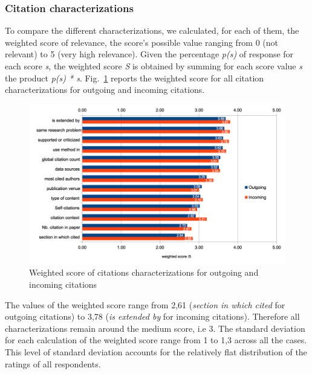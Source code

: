 \documentclass[runningheads,a4paper]{llncs}
\makeatletter
\def\maxwidth#1{\ifdim\Gin@nat@width>#1 #1\else\Gin@nat@width\fi}
\makeatother
\begin{document}
\subsubsection{Citation characterizations}

To compare the different characterizations, we calculated, for each of them, the weighted score of relevance, the score's possible value ranging from 0 (not relevant) to 5 (very high relevance). Given the percentage {\em p(s)} of response for each score {\em s}, the weighted score {\em S} is obtained by summing for each score value {\em s} the product {\em p(s) * s}. Fig.~\ref{refFigure0} reports the weighted score for all citation characterizations for outgoing and incoming citations.
\begin{figure}[h!]
\centering
\includegraphics[width=\maxwidth{\textwidth}]{img/100002010000037E0000022F667B4EDC37634C16.png}
\cprotect\caption{Weighted score of citations characterizations for outgoing and incoming citations}
\label{refFigure0}
\end{figure}


The values of the weighted score range from 2,61 ({\em section in which cited} for outgoing citations) to 3,78 ({\em is extended by} for incoming citations). Therefore all characterizations remain around the medium score, i.e 3. The standard deviation for each calculation of the weighted score range from 1 to 1,3 across all the cases. This level of standard deviation accounts for the relatively flat distribution of the ratings of all respondents.
\end{document}
